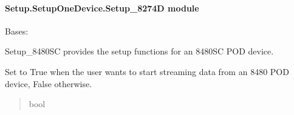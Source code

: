 \documentclass[letterpaper,10pt,english]{sphinxmanual}
\begin{document}
\paragraph{Setup.SetupOneDevice.Setup\_8274D module}
\label{\detokenize{Setup.SetupOneDevice:module-Setup.SetupOneDevice.Setup_8274D}}\label{\detokenize{Setup.SetupOneDevice:setup-setuponedevice-setup-8274d-module}}

\begin{fulllineitems}
\label{\detokenize{Setup.SetupOneDevice:Setup.SetupOneDevice.Setup_8274D.Setup8274D}}
\pysigstartsignatures
{}
\pysigstopsignatures
\sphinxAtStartPar
Bases: {\hyperref[\detokenize{Setup.SetupOneDevice:Setup.SetupOneDevice.Setup_PodInterface.SetupInterface}]{}}

\sphinxAtStartPar
Setup\_8480SC provides the setup functions for an 8480\sphinxhyphen{}SC POD device.

\begin{fulllineitems}
\label{\detokenize{Setup.SetupOneDevice:Setup.SetupOneDevice.Setup_8274D.Setup8274D._streamMode}}
\pysigstartsignatures
{}
\pysigstopsignatures
\sphinxAtStartPar
Set to True when the user wants to start streaming data from             an 8480 POD device, False otherwise.
\begin{quote}\begin{description}
\sphinxAtStartPar
bool

\end{description}\end{quote}

\end{fulllineitems}



\end{fulllineitems}
\end{document}
